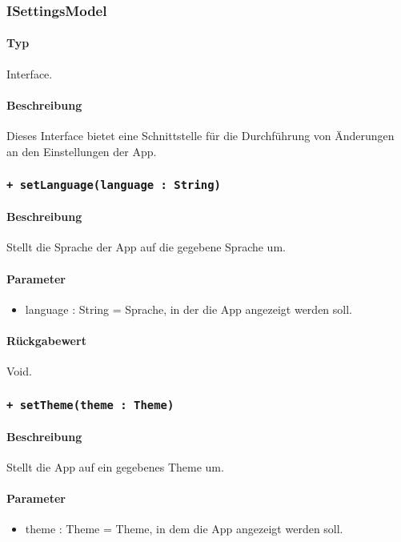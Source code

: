 \subsubsection{ISettingsModel}
\paragraph*{Typ}
Interface.
\paragraph*{Beschreibung}
Dieses Interface bietet eine Schnittstelle für die Durchführung von Änderungen an den Einstellungen der App.

\subsubsection*{\texttt{+ setLanguage(language : String)}}%
\paragraph*{Beschreibung}
Stellt die Sprache der App auf die gegebene Sprache um.
\paragraph*{Parameter}
\begin{itemize}
    \item language : String = Sprache, in der die App angezeigt werden soll.
\end{itemize}
\paragraph*{Rückgabewert}
Void.

\subsubsection*{\texttt{+ setTheme(theme : Theme)}}%
\paragraph*{Beschreibung}
Stellt die App auf ein gegebenes Theme um.
\paragraph*{Parameter}
\begin{itemize}
    \item theme : Theme = Theme, in dem die App angezeigt werden soll.
\end{itemize}
